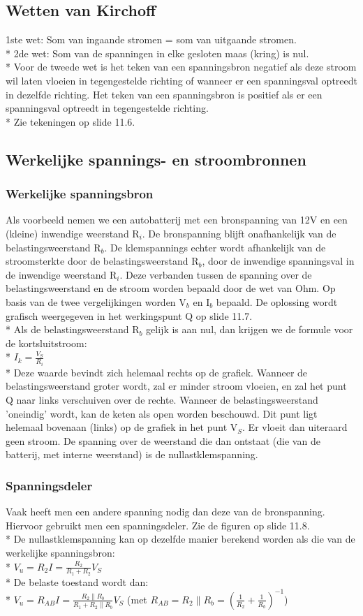 \documentclass[10pt]{article}
\begin{document}
\subsection{Wetten van Kirchoff}
1ste wet: Som van ingaande stromen = som van uitgaande stromen.\\*
2de wet: Som van de spanningen in elke gesloten maas (kring) is nul.\\*
Voor de tweede wet is het teken van een spanningsbron negatief als deze stroom wil laten vloeien in tegengestelde richting of wanneer er een spanningsval optreedt in dezelfde richting. Het teken van een spanningsbron is positief als er een spanningsval optreedt in tegengestelde richting.\\*
{\scriptsize Zie tekeningen op slide 11.6.}
\subsection{Werkelijke spannings- en stroombronnen}
\subsubsection{Werkelijke spanningsbron}
Als voorbeeld nemen we een autobatterij met een bronspanning van 12V en een (kleine) inwendige weerstand R$_i$. De bronspanning blijft onafhankelijk van de belastingsweerstand R$_b$. De klemspannings echter wordt afhankelijk van de stroomsterkte door de belastingsweerstand R$_b$, door de inwendige spanningsval in de inwendige weerstand R$_i$. Deze verbanden tussen de spanning over de belastingsweerstand en de stroom worden bepaald door de wet van Ohm. Op basis van de twee vergelijkingen worden V$_b$ en I$_b$ bepaald. De oplossing wordt grafisch weergegeven in het werkingspunt Q op slide 11.7.\\*
Als de belastingsweerstand R$_b$ gelijk is aan nul, dan krijgen we de formule voor de kortsluitstroom:\\*
$I_k = \frac{V_S}{R_i}$\\*
Deze waarde bevindt zich helemaal rechts op de grafiek. Wanneer de belastingsweerstand groter wordt, zal er minder stroom vloeien, en zal het punt Q naar links verschuiven over de rechte. Wanneer de belastingsweerstand 'oneindig' wordt, kan de keten als open worden beschouwd. Dit punt ligt helemaal bovenaan (links) op de grafiek in het punt V$_S$. Er vloeit dan uiteraard geen stroom. De spanning over de weerstand die dan ontstaat (die van de batterij, met interne weerstand) is de nullastklemspanning.
\subsubsection{Spanningsdeler}
Vaak heeft men een andere spanning nodig dan deze van de bronspanning. Hiervoor gebruikt men een spanningsdeler. Zie de figuren op slide 11.8.\\*
De nullastklemspanning kan op dezelfde manier berekend worden als die van de werkelijke spanningsbron:\\*
$V_u = R_2I = \frac{R_2}{R_1 + R_2}V_S$\\*
De belaste toestand wordt dan:\\*
$V_u = R_{AB}I = \frac{R_2\parallel R_b}{R_1 + R_2\parallel R_b}V_S$ (met $R_{AB} = R_2\parallel R_b = (\frac{1}{R_2} + \frac{1}{R_b})^{-1}$)
\end{document}
